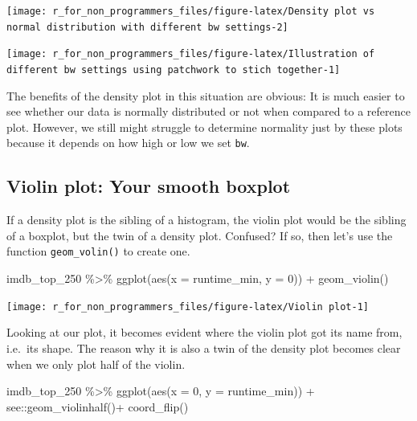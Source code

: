 \documentclass[
]{book}
\newenvironment{Shaded}{\begin{snugshade}}{\end{snugshade}}
\newcommand{\AttributeTok}[1]{\textcolor[rgb]{0.77,0.63,0.00}{#1}}
\newcommand{\DecValTok}[1]{\textcolor[rgb]{0.00,0.00,0.81}{#1}}
\newcommand{\FunctionTok}[1]{\textcolor[rgb]{0.00,0.00,0.00}{#1}}
\newcommand{\NormalTok}[1]{#1}
\newcommand{\SpecialCharTok}[1]{\textcolor[rgb]{0.00,0.00,0.00}{#1}}
\begin{document}
\begin{center}\texttt{[image: r\_for\_non\_programmers\_files/figure-latex/Density plot vs normal distribution with different bw settings-2]} \end{center}

\begin{center}\texttt{[image: r\_for\_non\_programmers\_files/figure-latex/Illustration of different bw settings using patchwork to stich together-1]} \end{center}

The benefits of the density plot in this situation are obvious: It is much easier to see whether our data is normally distributed or not when compared to a reference plot. However, we still might struggle to determine normality just by these plots because it depends on how high or low we set \texttt{bw}.

\hypertarget{violin-plot-your-smooth-boxplot}{%
\subsection{Violin plot: Your smooth boxplot}\label{violin-plot-your-smooth-boxplot}}

If a density plot is the sibling of a histogram, the violin plot would be the sibling of a boxplot, but the twin of a density plot. Confused? If so, then let's use the function \texttt{geom\_volin()} to create one.

\begin{Shaded}
\begin{Highlighting}[]
\NormalTok{imdb\_top\_250 }\SpecialCharTok{\%\textgreater{}\%}
  \FunctionTok{ggplot}\NormalTok{(}\FunctionTok{aes}\NormalTok{(}\AttributeTok{x =}\NormalTok{ runtime\_min, }\AttributeTok{y =} \DecValTok{0}\NormalTok{)) }\SpecialCharTok{+}
  \FunctionTok{geom\_violin}\NormalTok{()}
\end{Highlighting}
\end{Shaded}

\begin{center}\texttt{[image: r\_for\_non\_programmers\_files/figure-latex/Violin plot-1]} \end{center}

Looking at our plot, it becomes evident where the violin plot got its name from, i.e.~its shape. The reason why it is also a twin of the density plot becomes clear when we only plot half of the violin.

\begin{Shaded}
\begin{Highlighting}[]
\NormalTok{imdb\_top\_250 }\SpecialCharTok{\%\textgreater{}\%}
  \FunctionTok{ggplot}\NormalTok{(}\FunctionTok{aes}\NormalTok{(}\AttributeTok{x =} \DecValTok{0}\NormalTok{, }\AttributeTok{y =}\NormalTok{ runtime\_min)) }\SpecialCharTok{+}
\NormalTok{  see}\SpecialCharTok{::}\FunctionTok{geom\_violinhalf}\NormalTok{()}\SpecialCharTok{+}
  \FunctionTok{coord\_flip}\NormalTok{()}
\end{Highlighting}
\end{Shaded}
\end{document}
